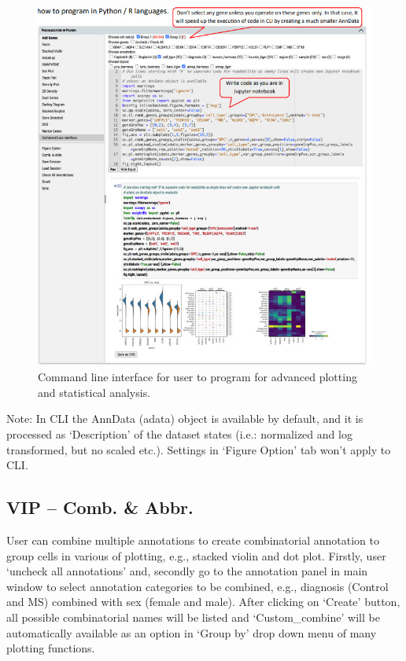 \documentclass[
]{article}
\begin{document}
\begin{figure}
\centering
\includegraphics{figures/F21.jpg}
\caption{Command line interface for user to program for advanced plotting and statistical analysis.}
\end{figure}

Note: In CLI the AnnData (adata) object is available by default, and it is processed as `Description' of the dataset states (i.e.: normalized and log transformed, but no scaled etc.). Settings in `Figure Option' tab won't apply to CLI.

\hypertarget{vip-comb.-abbr.}{%
\subsection{VIP -- Comb. \& Abbr.}\label{vip-comb.-abbr.}}

User can combine multiple annotations to create combinatorial annotation to group cells in various of plotting, e.g., stacked violin and dot plot. Firstly, user `uncheck all annotations' and, secondly go to the annotation panel in main window to select annotation categories to be combined, e.g., diagnosis (Control and MS) combined with sex (female and male). After clicking on `Create' button, all possible combinatorial names will be listed and `Custom\_combine' will be automatically available as an option in `Group by' drop down menu of many plotting functions.
\end{document}
